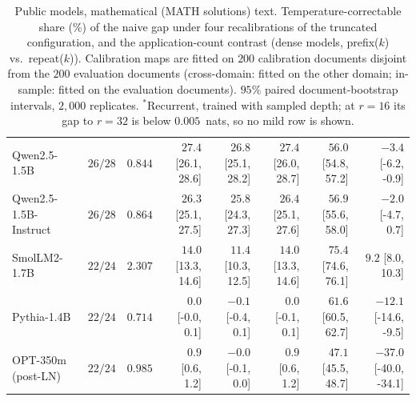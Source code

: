\begin{table}[t]
\begin{tabular}{llrrrrrr}
Qwen2.5-1.5B & $26/28$ & $0.844$ & $27.4$ {\tiny[26.1, 28.6]} & $26.8$ {\tiny[25.1, 28.2]} & $27.4$ {\tiny[26.0, 28.7]} & $56.0$ {\tiny[54.8, 57.2]} & $-3.4$ {\tiny[-6.2, -0.9]} \\
Qwen2.5-1.5B-Instruct & $26/28$ & $0.864$ & $26.3$ {\tiny[25.1, 27.5]} & $25.8$ {\tiny[24.3, 27.3]} & $26.4$ {\tiny[25.1, 27.6]} & $56.9$ {\tiny[55.6, 58.0]} & $-2.0$ {\tiny[-4.7, 0.7]} \\
SmolLM2-1.7B & $22/24$ & $2.307$ & $14.0$ {\tiny[13.3, 14.6]} & $11.4$ {\tiny[10.3, 12.5]} & $14.0$ {\tiny[13.3, 14.6]} & $75.4$ {\tiny[74.6, 76.1]} & $9.2$ {\tiny[8.0, 10.3]} \\
Pythia-1.4B & $22/24$ & $0.714$ & $0.0$ {\tiny[-0.0, 0.1]} & $-0.1$ {\tiny[-0.4, 0.1]} & $0.0$ {\tiny[-0.1, 0.1]} & $61.6$ {\tiny[60.5, 62.7]} & $-12.1$ {\tiny[-14.6, -9.5]} \\
OPT-350m (post-LN) & $22/24$ & $0.985$ & $0.9$ {\tiny[0.6, 1.2]} & $-0.0$ {\tiny[-0.1, 0.0]} & $0.9$ {\tiny[0.6, 1.2]} & $47.1$ {\tiny[45.5, 48.7]} & $-37.0$ {\tiny[-40.0, -34.1]} \\
\bottomrule
\end{tabular}
\caption{Public models, mathematical (MATH solutions) text. Temperature-correctable share (\%) of the naive gap under four recalibrations of the truncated configuration, and the application-count contrast (dense models, prefix($k$) vs.\ repeat($k$)). Calibration maps are fitted on $200$ calibration documents disjoint from the $200$ evaluation documents (cross-domain: fitted on the other domain; in-sample: fitted on the evaluation documents). $95\%$ paired document-bootstrap intervals, $2{,}000$ replicates. $^{\ast}$Recurrent, trained with sampled depth; at $r = 16$ its gap to $r = 32$ is below $0.005$~nats, so no mild row is shown.}
\label{tab:public-math}
\end{table}

